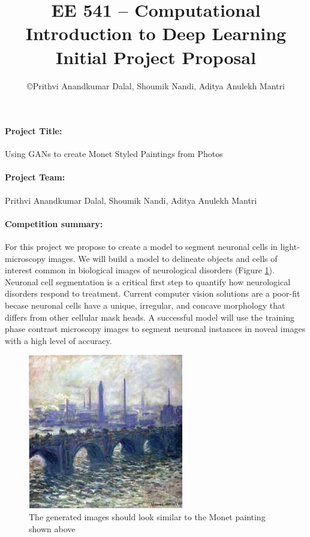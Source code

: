 \documentclass[11pt]{article}
\title{\bf {\small EE 541 -- Computational Introduction to Deep Learning} \\ Initial Project Proposal}
\author{\copyright Prithvi Anandkumar Dalal, Shoumik Nandi, Aditya Anulekh Mantri}
\begin{document}
    \maketitle

    \paragraph{Project Title:}  Using GANs to create Monet Styled Paintings from Photos

    \paragraph{Project Team:} Prithvi Anandkumar Dalal, Shoumik Nandi, Aditya Anulekh Mantri

    \paragraph{Competition summary:}
    For this project we propose to create a model to segment neuronal cells in light-microscopy images.
    We will build a model to delineate objects and cells of interest common in biological images of neurological disorders (Figure \ref{fig:nseg}).
    Neuronal cell segmentation is a critical first step to quantify how neurological disorders respond to treatment.
    Current computer vision solutions are a poor-fit becase neuronal cells have a unique, irregular, and concave morphology that differs from other cellular mask heads.
    A successful model will use the training phase contrast microscopy images to segment neuronal instances in noveal images with a high level of accuracy.

    \begin{figure}[!htb]
        \begin{center}
            \includegraphics[width=0.3\linewidth]{images/3b262c6726}
            \caption{The generated images should look similar to the Monet painting shown above}
            \label{fig:nseg}
        \end{center}
        \vspace{-0.6cm}
    \end{figure}
\end{document}

